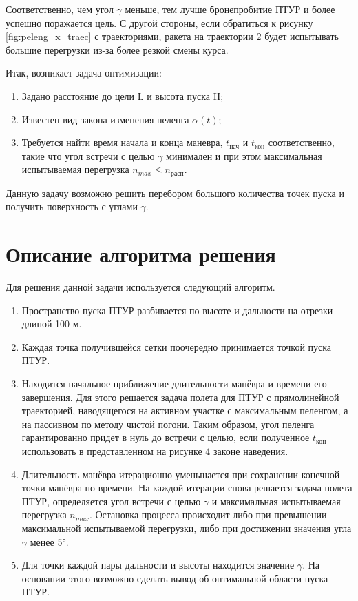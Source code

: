 Соответственно, чем угол $\gamma$ меньше, тем лучше бронепробитие ПТУР и более успешно поражается цель. С другой стороны, если обратиться к рисунку \ref{fig:peleng_x_traec} с траекториями, ракета на траектории 2 будет испытывать большие перегрузки из-за более резкой смены курса. 

\clearpage
Итак, возникает задача оптимизации:
\begin{enumerate}[1.]
	\item Задано расстояние до цели L и высота пуска H;
	\item Известен вид закона изменения пеленга $\alpha (t)$;
	\item Требуется найти время начала и конца маневра, $t_\text{нач}$ и $t_\text{кон}$ соответственно, такие что угол встречи с целью $\gamma$ минимален и при этом максимальная испытываемая перегрузка $n_{max} ≤ n_\text{расп}$.
\end{enumerate}

Данную задачу возможно решить перебором большого количества точек пуска и получить поверхность с углами $\gamma$.

\section{Описание алгоритма решения} \label{chapter:traectory_optimization}
Для решения данной задачи используется следующий алгоритм.
\begin{enumerate}[1.]
	\item Пространство пуска ПТУР разбивается по высоте и дальности на отрезки длиной 100 м.
	\item Каждая точка получившейся сетки поочередно принимается точкой пуска ПТУР. 
	\item Находится начальное приближение длительности манёвра и времени его завершения. Для этого решается задача полета для ПТУР с прямолинейной траекторией, наводящегося на активном участке с максимальным пеленгом, а на пассивном по методу чистой погони. Таким образом, угол пеленга гарантированно придет в нуль до встречи с целью, если полученное $t_\text{кон}$  использовать в представленном на рисунке 4 законе наведения. 
	\item Длительность манёвра итерационно уменьшается при сохранении конечной точки манёвра по времени. На каждой итерации снова решается задача полета ПТУР, определяется угол встречи с целью $\gamma$ и максимальная испытываемая перегрузка $n_{max}$. Остановка процесса происходит либо при превышении максимальной испытываемой перегрузки, либо при достижении значения угла $\gamma$ менее 5°.
	\item Для точки каждой пары дальности и высоты находится значение $\gamma$. На основании этого возможно сделать вывод об оптимальной области пуска ПТУР.
\end{enumerate}

